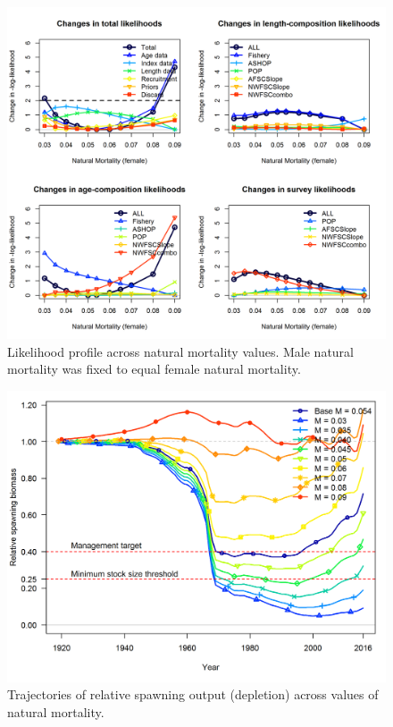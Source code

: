 \documentclass[12pt,]{article}
\begin{document}
\FloatBarrier

\begin{figure}
\centering
\includegraphics{Figures/piner_panel_m.png}
\caption{Likelihood profile across natural mortality values. Male
natural mortality was fixed to equal female natural mortality.
\label{fig:m_like}}
\end{figure}

\FloatBarrier

\begin{figure}
\centering
\includegraphics{Figures/m_trajectories.png}
\caption{Trajectories of relative spawning output (depletion) across
values of natural mortality. \label{fig:m_trajectory}}
\end{figure}
\end{document}
